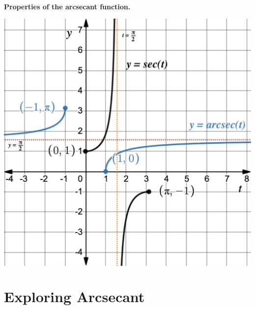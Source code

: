 \documentclass{ximera}
\begin{document}
\begin{callout}{\bf Properties of the arcsecant function.}
\begin{itemize}
%
\end{itemize}
\includegraphics[width=1\linewidth]{secArcsecGraphst.pdf}
\end{callout}

\section{Exploring Arcsecant} 
\end{document}
